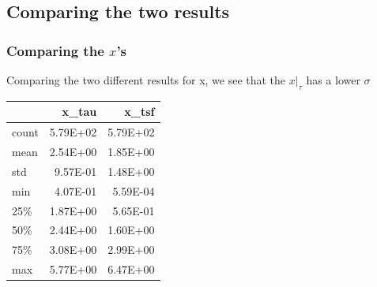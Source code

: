 \documentclass[a4paper,twocolumn]{article}
\begin{document}
\subsection{Comparing the two results}
\label{sec:orgd5edef3}

\subsubsection{Comparing the \(x\)'s}
\label{sec:orgd408258}


Comparing the two different results for x, we see that the \(x|_\tau\) has a lower \(\sigma\)

\begin{table}[hc]
\centering
\begin{tabular}{lrr}
\toprule
{} &    x\_tau &    x\_tsf \\
\midrule
count & 5.79E+02 & 5.79E+02 \\
mean  & 2.54E+00 & 1.85E+00 \\
std   & 9.57E-01 & 1.48E+00 \\
min   & 4.07E-01 & 5.59E-04 \\
25\%   & 1.87E+00 & 5.65E-01 \\
50\%   & 2.44E+00 & 1.60E+00 \\
75\%   & 3.08E+00 & 2.99E+00 \\
max   & 5.77E+00 & 6.47E+00 \\
\bottomrule
\end{tabular}
\end{table}
\end{document}
